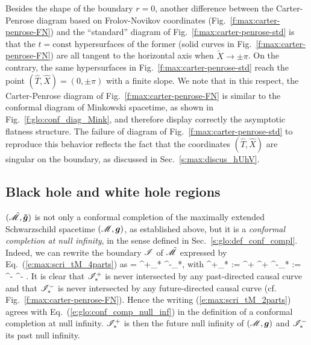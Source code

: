 Besides the shape of the boundary $r=0$, another difference between
the Carter-Penrose diagram based on Frolov-Novikov coordinates
(Fig.~\ref{f:max:carter-penrose-FN}) and the ``standard'' diagram
of Fig.~\ref{f:max:carter-penrose-std} is that the $t=\mathrm{const}$
hypersurfaces of the former (solid curves in Fig.~\ref{f:max:carter-penrose-FN})
are all tangent to the horizontal axis when $\tilde{X}\rightarrow \pm\pi$.
On the contrary, the same hypersurfaces in Fig.~\ref{f:max:carter-penrose-std}
reach the point $(\hat{T},\hat{X}) = (0,\pm\pi)$ with a finite slope.
We note that in this respect, the Carter-Penrose diagram of
Fig.~\ref{f:max:carter-penrose-FN} is similar to the conformal diagram of
Minkowski spacetime, as shown in Fig.~\ref{f:glo:conf_diag_Mink}, and
therefore display correctly the asymptotic flatness structure.
The failure of diagram of Fig.~\ref{f:max:carter-penrose-std} to reproduce
this behavior reflects the fact that the coordinates $(\hat{T},\hat{X})$ are singular on the
boundary, as discussed in Sec.~\ref{s:max:discus_hUhV}.


\subsection{Black hole and white hole regions} \label{s:max:black_white}

$(\tilde{\mathscr{M}},\bm{\tilde{g}})$ is not only a conformal
completion of the maximally extended Schwarzschild spacetime $(\mathscr{M},\bm{g})$,
as established above, but it is a \emph{conformal completion at null infinity}, in the sense defined in Sec.~\ref{s:glo:def_conf_compl}.
Indeed, we can rewrite the boundary $\mathscr{I}$
of $\tilde{\mathscr{M}}$ expressed by Eq.~(\ref{e:max:scri_tM_4parts}) as
\be \label{e:max:scri_tM_2parts}
    \scri = \scri^+_* \cup \scri^-_*,
\ee
with
\be
    \scri^+_* := \scri^+ ^+ \qand
    \scri^-_* := \scri^- ^- .
\ee
It is clear that $\mathscr{I}^+_*$ is never intersected by any past-directed causal curve
and that $\mathscr{I}^-_*$ is never intersected by any future-directed causal curve
(cf. Fig.~\ref{f:max:carter-penrose-FN}). Hence the writing (\ref{e:max:scri_tM_2parts})
agrees with Eq.~(\ref{e:glo:conf_comp_null_inf}) in the definition of a conformal
completion at null infinity. $\mathscr{I}^+_*$ is then the future null infinity
of $(\mathscr{M}, \bm{g})$ and $\mathscr{I}^-_*$ its past null infinity.

